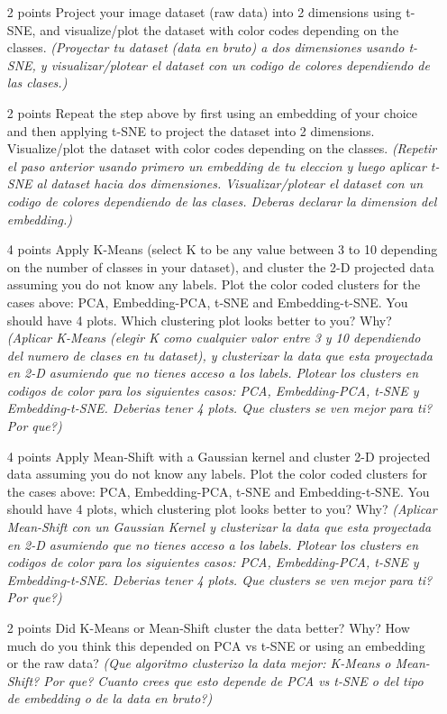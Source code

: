 \documentclass{article}
\begin{document}
\begin{enumerate}
        \item [2 points] Project your image dataset (raw data) into 2 dimensions using t-SNE, and visualize/plot the dataset with color codes depending on the classes. \textit{(Proyectar tu dataset (data en bruto) a dos dimensiones usando t-SNE, y visualizar/plotear el dataset con un codigo de colores dependiendo de las clases.)}

        \item [2 points] Repeat the step above by first using an embedding of your choice and then applying t-SNE to project the dataset into 2 dimensions. Visualize/plot the dataset with color codes depending on the classes. \textit{(Repetir el paso anterior usando primero un embedding de tu eleccion y luego aplicar t-SNE al dataset hacia dos dimensiones. Visualizar/plotear el dataset con un codigo de colores dependiendo de las clases. Deberas declarar la dimension del embedding.)}

        \item [4 points] Apply K-Means (select K to be any value between 3 to 10 depending on the number of classes in your dataset), and cluster the 2-D projected data assuming you do not know any labels. Plot the color coded clusters for the cases above: PCA, Embedding-PCA, t-SNE and Embedding-t-SNE. You should have 4 plots. Which clustering plot looks better to you? Why? \textit{(Aplicar K-Means (elegir K como cualquier valor entre 3 y 10 dependiendo del numero de clases en tu dataset), y clusterizar la data que esta proyectada en 2-D asumiendo que no tienes acceso a los labels. Plotear los clusters en codigos de color para los siguientes casos: PCA, Embedding-PCA, t-SNE y Embedding-t-SNE. Deberias tener 4 plots. Que clusters se ven mejor para ti? Por que?)}

        \item [4 points] Apply Mean-Shift with a Gaussian kernel and cluster 2-D projected data assuming you do not know any labels. Plot the color coded clusters for the cases above: PCA, Embedding-PCA, t-SNE and Embedding-t-SNE. You should have 4 plots, which clustering plot looks better to you? Why? \textit{(Aplicar Mean-Shift con un Gaussian Kernel y clusterizar la data que esta proyectada en 2-D asumiendo que no tienes acceso a los labels. Plotear los clusters en codigos de color para los siguientes casos: PCA, Embedding-PCA, t-SNE y Embedding-t-SNE. Deberias tener 4 plots. Que clusters se ven mejor para ti? Por que?)}

        \item[2 points] Did K-Means or Mean-Shift cluster the data better? Why? How much do you think this depended on PCA vs t-SNE or using an embedding or the raw data? \textit{(Que algoritmo clusterizo la data mejor: K-Means o Mean-Shift? Por que? Cuanto crees que esto depende de PCA vs t-SNE o del tipo de embedding o de la data en bruto?)}



\end{enumerate}
\end{document}
